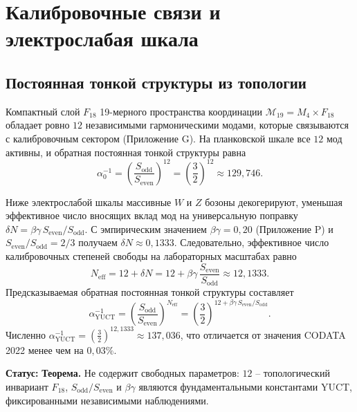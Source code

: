 \documentclass[12pt,a4paper]{article}
\begin{document}
	\section{Калибровочные связи и электрослабая шкала}
	\label{sec:gauge}
	
	\subsection{Постоянная тонкой структуры из топологии}
	
	Компактный слой \(F_{18}\) 19-мерного пространства координации \(\mathcal{M}_{19}=M_4\times F_{18}\) обладает ровно \(12\) независимыми гармоническими модами, которые связываются с калибровочным сектором (Приложение G). На планковской шкале все \(12\) мод активны, и обратная постоянная тонкой структуры равна
	\begin{equation}
		\alpha_0^{-1} = \left(\frac{S_{\mathrm{odd}}}{S_{\mathrm{even}}}\right)^{12}
		= \left(\frac{3}{2}\right)^{12} \approx 129,746 .
	\end{equation}
	
	Ниже электрослабой шкалы массивные \(W\) и \(Z\) бозоны декогерируют, уменьшая эффективное число вносящих вклад мод на универсальную поправку \(\delta N = \beta\gamma \, S_{\mathrm{even}}/S_{\mathrm{odd}}\). С эмпирическим значением \(\beta\gamma = 0,20\) (Приложение P) и \(S_{\mathrm{even}}/S_{\mathrm{odd}} = 2/3\) получаем \(\delta N \approx 0,1333\). Следовательно, эффективное число калибровочных степеней свободы на лабораторных масштабах равно
	\begin{equation}
		N_{\mathrm{eff}} = 12 + \delta N = 12 + \beta\gamma\,\frac{S_{\mathrm{even}}}{S_{\mathrm{odd}}} \approx 12,1333 .
	\end{equation}
	Предсказываемая обратная постоянная тонкой структуры составляет
	\begin{equation}
		\boxed{\alpha^{-1}_{\mathrm{YUCT}} =
			\left(\frac{S_{\mathrm{odd}}}{S_{\mathrm{even}}}\right)^{N_{\mathrm{eff}}}
			= \left(\frac{3}{2}\right)^{12 + \beta\gamma\,S_{\mathrm{even}}/S_{\mathrm{odd}}} } .
		\label{eq:alpha-yuct}
	\end{equation}
	Численно \(\alpha^{-1}_{\mathrm{YUCT}} = \left(\frac{3}{2}\right)^{12,1333} \approx 137,036\), что отличается от значения CODATA 2022 менее чем на \(0,03\%\).
	
	\textbf{Статус:} \textbf{Теорема.} Не содержит свободных параметров: \(12\) – топологический инвариант \(F_{18}\), \(S_{\mathrm{odd}}/S_{\mathrm{even}}\) и \(\beta\gamma\) являются фундаментальными константами YUCT, фиксированными независимыми наблюдениями.
	
\end{document}
